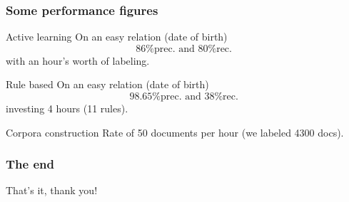 \documentclass{beamer}
\begin{document}
\begin{frame}
\frametitle{Some performance figures}

\begin{block}{Active learning}
On an easy relation (date of birth)
\[ 86\text{\% prec. and } 80\text{\% rec. }\]
with an hour's worth of labeling.
\end{block}

\begin{block}{Rule based}
On an easy relation (date of birth)
\[ 98.65\text{\% prec. and } 38\text{\% rec. }\]
investing 4 hours (11 rules).
\end{block}

\begin{block}{Corpora construction}
Rate of 50 documents per hour (we labeled 4300 docs).
\end{block}




\end{frame}


\begin{frame}
\frametitle{The end}

\Huge{\centerline{That's it, thank you!}}

\end{frame}
\end{document}
